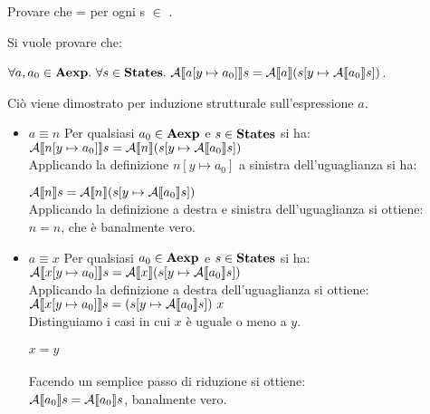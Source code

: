 {
	Provare che
	 =
	 per ogni s $\in$
	\states.
}
{
Si vuole provare che:

$\forall{a,a_0} \in \textbf{Aexp}.\mbox{ }
\forall{s} \in \textbf{States}.\mbox{ }
\mathcal{A} \llbracket a [y \mapsto{} a_0] \rrbracket s =
\mathcal{A} \llbracket a \rrbracket (s [y \mapsto{} \mathcal{A} \llbracket a_0 \rrbracket s])$.

Ciò viene dimostrato per induzione strutturale sull'espressione $a$.
\begin{itemize}
	\item $\boxed{a \equiv n}$ Per qualsiasi $a_0 \in \textbf{Aexp}$ e $s \in \textbf{States}$ si ha:
\\

$\mathcal{A} \llbracket n [y \mapsto{} a_0] \rrbracket s = \mathcal{A} \llbracket n \rrbracket (s [y \mapsto{} \mathcal{A} \llbracket a_0 \rrbracket s]) $
\\

Applicando la definizione $n [y \mapsto{} a_0]$ a sinistra dell'uguaglianza si
ha:

$\mathcal{A} \llbracket n \rrbracket s = \mathcal{A} \llbracket n \rrbracket (s [y \mapsto{} \mathcal{A} \llbracket a_0 \rrbracket s]) $
\\

Applicando la definizione  a destra e sinistra dell'uguaglianza si ottiene:
\\

$n = n$, che è banalmente vero.

\item $\boxed{a \equiv x}$ Per qualsiasi $a_0 \in \textbf{Aexp}$ e $s \in \textbf{States}$ si ha:
\\

$\mathcal{A} \llbracket x [y \mapsto{} a_0] \rrbracket s = \mathcal{A} \llbracket x \rrbracket (s [y \mapsto{} \mathcal{A} \llbracket a_0 \rrbracket s]) $
\\

Applicando la definizione  a destra dell'uguaglianza si ottiene:
\\

$\mathcal{A} \llbracket x [y \mapsto{} a_0] \rrbracket s = (s [y \mapsto{} \mathcal{A} \llbracket a_0 \rrbracket s]) \mbox{ } x $
\\

Distinguiamo i casi in cui $x$ è uguale o meno a $y$.

\paragraph{$x = y$} Facendo un semplice passo di riduzione si ottiene:
\\

$\mathcal{A} \llbracket a_0 \rrbracket s = \mathcal{A} \llbracket a_0 \rrbracket s$,
banalmente vero.


\end{itemize}}
